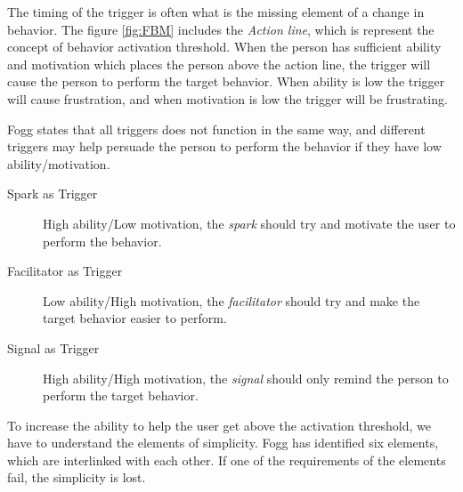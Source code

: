 The timing of the trigger is often what is the missing element of a change in behavior. The figure \ref{fig:FBM} includes the \textit{Action line}, which is represent the concept of behavior activation threshold. When the person has sufficient ability and motivation which places the person above the action line, the trigger will cause the person to perform the target behavior. When ability is low the trigger will cause frustration, and when motivation is low the trigger will be frustrating.

Fogg states that all triggers does not function in the same way, and different triggers may help persuade the person to perform the behavior if they have low ability/motivation.

\begin{description}
  \item[Spark as Trigger] High ability/Low motivation, the \textit{spark} should try and motivate the user to perform the behavior.
  \item[Facilitator as Trigger] Low ability/High motivation, the \textit{facilitator} should try and make the target behavior easier to perform.
  \item[Signal as Trigger]  High ability/High motivation, the \textit{signal} should only remind the person to perform the target behavior.
\end{description}

To increase the ability to help the user get above the activation threshold, we have to understand the elements of simplicity. Fogg has identified six elements, which are interlinked with each other. If one of the requirements of the elements fail, the simplicity is lost.

